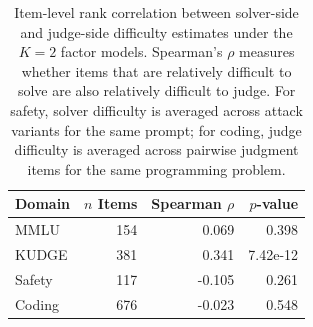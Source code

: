\begin{table}[h]
\centering
\small
\begin{tabular}{lrrr}
\toprule
\textbf{Domain} & \textbf{$n$ Items} & \textbf{Spearman $\rho$} & \textbf{$p$-value} \\
\midrule
MMLU & 154 & 0.069 & 0.398 \\
KUDGE & 381 & 0.341 & 7.42e-12 \\
Safety & 117 & -0.105 & 0.261 \\
Coding & 676 & -0.023 & 0.548 \\
\bottomrule
\end{tabular}
\caption{
Item-level rank correlation between solver-side and judge-side difficulty estimates under the $K=2$ factor models. Spearman's $\rho$ measures whether items that are relatively difficult to solve are also relatively difficult to judge. For safety, solver difficulty is averaged across attack variants for the same prompt; for coding, judge difficulty is averaged across pairwise judgment items for the same programming problem.
}
\label{tab:k2_item_difficulty_spearman}
\end{table}
